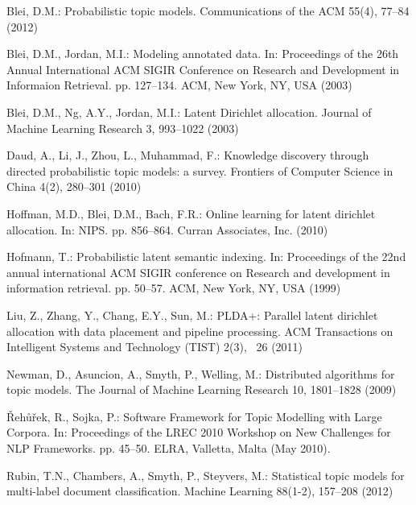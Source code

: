 \documentclass[russian]{llncs}
\begin{document}
\begin{thebibliography}{10}

Blei, D.M.: Probabilistic topic models. Communications of the ACM  55(4),
  77--84 (2012)

Blei, D.M., Jordan, M.I.: Modeling annotated data. In: Proceedings of the 26th
  Annual International ACM SIGIR Conference on Research and Development in
  Informaion Retrieval. pp. 127--134. ACM, New York, NY, USA (2003)

Blei, D.M., Ng, A.Y., Jordan, M.I.: Latent {Dirichlet} allocation. Journal of
  Machine Learning Research  3,  993--1022 (2003)

Daud, A., Li, J., Zhou, L., Muhammad, F.: Knowledge discovery through directed
  probabilistic topic models: a survey. Frontiers of Computer Science in China
  4(2),  280--301 (2010)

Hoffman, M.D., Blei, D.M., Bach, F.R.: Online learning for latent dirichlet
  allocation. In: NIPS. pp. 856--864. Curran Associates, Inc. (2010)

Hofmann, T.: Probabilistic latent semantic indexing. In: Proceedings of the
  22nd annual international ACM SIGIR conference on Research and development in
  information retrieval. pp. 50--57. ACM, New York, NY, USA (1999)

Liu, Z., Zhang, Y., Chang, E.Y., Sun, M.: PLDA+: Parallel latent dirichlet
  allocation with data placement and pipeline processing. ACM Transactions on
  Intelligent Systems and Technology (TIST)  2(3), ~26 (2011)

Newman, D., Asuncion, A., Smyth, P., Welling, M.: Distributed algorithms for
  topic models. The Journal of Machine Learning Research  10,  1801--1828
  (2009)

{\v R}eh{\r u}{\v r}ek, R., Sojka, P.: {Software Framework for Topic Modelling
  with Large Corpora}. In: {Proceedings of the LREC 2010 Workshop on New
  Challenges for NLP Frameworks}. pp. 45--50. ELRA, Valletta, Malta (May 2010).

Rubin, T.N., Chambers, A., Smyth, P., Steyvers, M.: Statistical topic models
  for multi-label document classification. Machine Learning  88(1-2),  157--208
  (2012)


\end{thebibliography}
\end{document}
